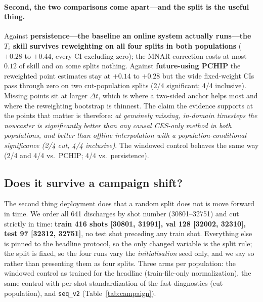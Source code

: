\documentclass[10pt]{article}
\newcommand{\Ti}{\ensuremath{T_i}}
\newcommand{\seqv}{\texttt{seq\_v2}}
\begin{document}
\paragraph{Second, the two comparisons come apart---and the split is the useful
thing.} Against \textbf{persistence---the baseline an online system actually
runs---the \Ti{} skill survives reweighting on all four splits in both
populations} ($+0.28$ to $+0.44$, every CI excluding zero); the MNAR correction
costs at most $0.12$ of skill and on some splits nothing. Against
\textbf{future-using PCHIP} the reweighted point estimates stay at $+0.14$ to
$+0.28$ but the wide fixed-weight CIs pass through zero on two cut-population
splits (2/4 significant; 4/4 inclusive). Missing points sit at larger
$\Delta t$, which is where a two-sided anchor helps most and where the reweighting
bootstrap is thinnest. The claim the evidence supports at the points that matter
is therefore: \emph{at genuinely missing, in-domain timesteps the nowcaster is
significantly better than any causal CES-only method in both populations, and
better than offline interpolation with a population-conditional significance
(2/4 cut, 4/4 inclusive)}. The windowed control behaves the same way (2/4 and
4/4 vs.\ PCHIP; 4/4 vs.\ persistence).

\subsection{Does it survive a campaign shift?}
\label{sec:campaign}

The second thing deployment does that a random split does not is move forward in
time. We order all 641 discharges by shot number (30801--32751) and cut strictly in
time: \textbf{train 416 shots [30801, 31991], val 128 [32002, 32310], test 97
[32312, 32751]}, no test shot preceding any train shot. Everything else is pinned
to the headline protocol, so the only changed variable is the split rule; the
split is fixed, so the four runs vary the \emph{initialisation} seed only, and we
say so rather than presenting them as four splits. Three arms per population:
the windowed control as trained for the headline (train-file-only
normalization), the same control with per-shot standardization of the fast
diagnostics (cut population), and \seqv{} (Table~\ref{tab:campaign}).
\end{document}

